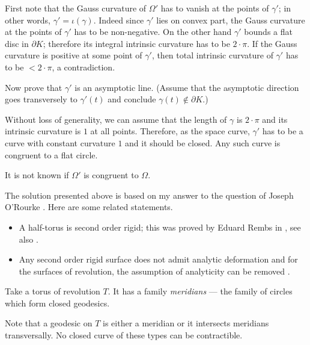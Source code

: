 First note that the Gauss curvature of $\Omega'$ has to vanish at the points of $\gamma'$;
in other words, $\gamma'=\iota(\gamma)$.
Indeed since $\gamma'$ lies on convex part, 
the Gauss curvature at the points of $\gamma'$ has to be non-negative. 
On the other hand $\gamma'$ bounds a flat disc in $\partial K$;
therefore its integral intrinsic curvature has to be $2{\cdot}\pi$.
If the Gauss curvature is positive at some point of $\gamma'$, 
then total intrinsic curvature of $\gamma'$ has to be $<2{\cdot}\pi$, a contradiction.

Now prove that $\gamma'$ is an asymptotic line.
(Assume that the asymptotic direction goes transversely to $\gamma'(t)$ and conclude $\gamma(t)\notin\partial K$.)

Without loss of generality, we can assume that the length of $\gamma$ is $2{\cdot}\pi$ and its intrinsic curvature is $1$ at all points.
Therefore, as the space curve,
$\gamma'$ has to be a curve with constant curvature $1$ and it should be closed.
Any such curve is congruent to a flat circle.\qeds

It is not known if $\Omega'$ is congruent to $\Omega$.

The solution presented above is based on my answer 
to the question of Joseph O'Rourke \cite[see][]{rourke}.
Here are some related statements.
\begin{itemize}
\item A half-torus is second order rigid;
this was proved by Eduard Rembs in
\cite{rembs}, see also \cite[][135]{efimov}.
\item Any second order rigid surface does not admit analytic deformation 
\cite[proved by Nikolay Efimov, see][121]{efimov}
and for the surfaces of revolution, the assumption of analyticity can be removed 
\cite[proved by Idzhad Sabitov, see][]{sabitov}.
\end{itemize}









Take a torus of revolution $T$.
It has a family {}\emph{meridians} --- the family of circles which form closed geodesics.

Note that a geodesic on $T$ is either a meridian
or it intersects meridians transversally.
No closed curve of these types can be contractible.\qeds 




